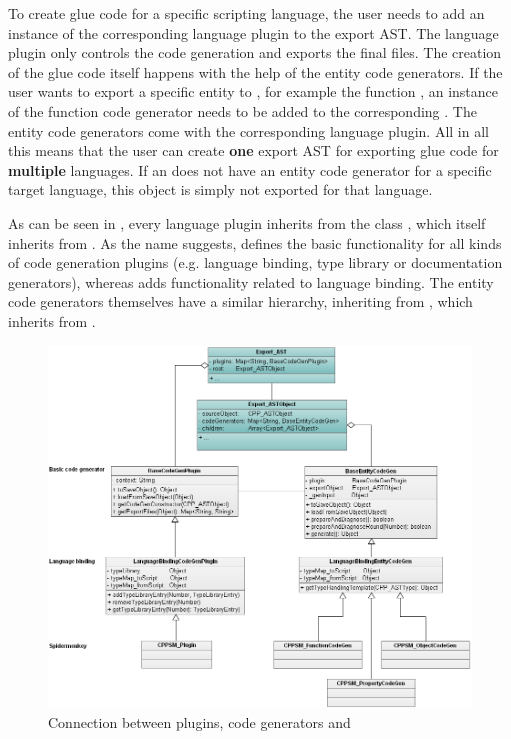 To create glue code for a specific scripting language, the user needs to add an instance of the corresponding language plugin to the export AST. The language plugin only controls the code generation and exports the final files. The creation of the glue code itself happens with the help of the entity code generators. If the user wants to export a specific  entity to , for example the function , an instance of the  function code generator needs to be added to the corresponding . The entity code generators come with the corresponding language plugin. All in all this means that the user can create \textbf{one} export AST for exporting glue code for \textbf{multiple} languages. If an  does not have an entity code generator for a specific target language, this object is simply not exported for that language.

As can be seen in , every language plugin inherits from the class \linebreak{}, which itself inherits from . As the name suggests,  defines the basic functionality for all kinds of code generation plugins (e.g. language binding, type library or documentation \linebreak generators), whereas  adds functionality related to \linebreak language binding. The entity code generators themselves have a similar hierarchy, inheriting from , which inherits from \linebreak{}.

\begin{figure}[h!] %
	\centering
		\includegraphics[scale=0.45]{Images/UMLCodegen.png}
	\caption{Connection between plugins, code generators and }
	\label{fig:UMLCodeGen}
\end{figure}

